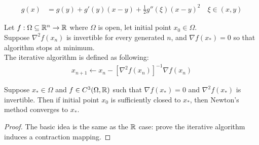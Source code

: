 \documentclass{article}
\begin{document}
	\begin{lemma}
		\begin{align}
			g(x) &= g(y) + g'(y) (x - y) + \frac{1}{2} g''(\xi) (x - y)^2\quad \xi \in (x, y)
		\end{align}
	\end{lemma}
	
	\begin{algorithm}
		Let $f: \Omega \subseteq \mathbb{R}^n \to \mathbb{R}$ where $\Omega$ is open, let initial point $x_0 \in \Omega$. \\
		Suppose $\nabla^2 f(x_n)$ is invertible for every generated $n$, and $\nabla f(x_*) = 0$ so that algorithm stops at minimum. \\
		The iterative algorithm is defined as following:
		\begin{align}
			x_{n+1} \leftarrow x_n - [\nabla^2 f(x_n)]^{-1} \nabla f(x_n)
		\end{align}
	\end{algorithm}
	
	\begin{theorem}[Generalization]
		Suppose $x_* \in \Omega$ and $f \in C^3(\Omega, \mathbb{R})$ such that $\nabla f(x_*) = 0$ and $\nabla^2 f(x_*)$ is invertible. Then if initial point $x_0$ is sufficiently closed to $x_*$, then Newton's method converges to $x_*$.
	\end{theorem}
	
	\begin{proof}
		The basic idea is the same as the $\mathbb{R}$ case: prove the iterative algorithm induces a contraction mapping.
	\end{proof}
	
\end{document}
